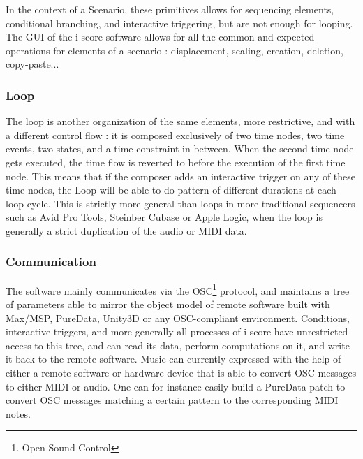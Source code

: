 \documentclass{article}
\begin{document}
In the context of a Scenario, these primitives allows for sequencing elements, conditional branching, and interactive triggering, but are not enough for looping.
The GUI of the i-score software allows for all the common and expected operations for elements of a scenario : displacement, scaling, creation, deletion, copy-paste...

\subsubsection{Loop}
The loop is another organization of the same elements, more restrictive, and with a different control flow : it is 
composed exclusively of two time nodes, two time events, two states, and a time constraint in between.
When the second time node gets executed, the time flow is reverted to before the execution of the first time node.
This means that if the composer adds an interactive trigger on any of these time nodes, the Loop will be able to do pattern of different durations at each loop cycle.
This is strictly more general than loops in more traditional sequencers such as Avid Pro Tools, Steinber Cubase or Apple Logic, when the loop is generally a strict duplication of the audio or MIDI data.

\subsubsection{Communication}
The software mainly communicates via the OSC\footnote{Open Sound Control} protocol,  and maintains a tree of parameters able to mirror 
the object model of remote software built with Max/MSP, PureData, Unity3D or any OSC-compliant environment. 
Conditions, interactive triggers, and more generally all processes of i-score have unrestricted 
access to this tree, and can read its data, perform computations on it, and write it back to the 
remote software.
Music can currently expressed with the help of either a remote software or hardware device that is able 
to convert OSC messages to either MIDI or audio.
One can for instance easily build a PureData patch to convert OSC messages matching a certain pattern 
to the corresponding MIDI notes.
\end{document}
